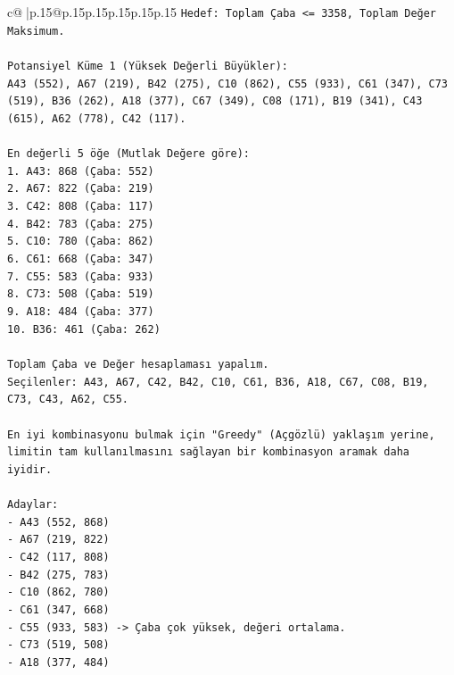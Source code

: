 \documentclass{article}
\begin{document}
{\begin{supertabular}{c@{$\;$}|p{.15\linewidth}@{}p{.15\linewidth}p{.15\linewidth}p{.15\linewidth}p{.15\linewidth}p{.15\linewidth}}
{{{\texttt{Hedef: Toplam Çaba <= 3358, Toplam Değer Maksimum.} \\
\\ 
\texttt{Potansiyel Küme 1 (Yüksek Değerli Büyükler):} \\
\texttt{A43 (552), A67 (219), B42 (275), C10 (862), C55 (933), C61 (347), C73 (519), B36 (262), A18 (377), C67 (349), C08 (171), B19 (341), C43 (615), A62 (778), C42 (117).} \\
\\ 
\texttt{En değerli 5 öğe (Mutlak Değere göre):} \\
\texttt{1. A43: 868 (Çaba: 552)} \\
\texttt{2. A67: 822 (Çaba: 219)} \\
\texttt{3. C42: 808 (Çaba: 117)} \\
\texttt{4. B42: 783 (Çaba: 275)} \\
\texttt{5. C10: 780 (Çaba: 862)} \\
\texttt{6. C61: 668 (Çaba: 347)} \\
\texttt{7. C55: 583 (Çaba: 933)} \\
\texttt{8. C73: 508 (Çaba: 519)} \\
\texttt{9. A18: 484 (Çaba: 377)} \\
\texttt{10. B36: 461 (Çaba: 262)} \\
\\ 
\texttt{Toplam Çaba ve Değer hesaplaması yapalım.} \\
\texttt{Seçilenler: A43, A67, C42, B42, C10, C61, B36, A18, C67, C08, B19, C73, C43, A62, C55.} \\
\\ 
\texttt{En iyi kombinasyonu bulmak için "Greedy" (Açgözlü) yaklaşım yerine, limitin tam kullanılmasını sağlayan bir kombinasyon aramak daha iyidir.} \\
\\ 
\texttt{Adaylar:} \\
\texttt{{-} A43 (552, 868)} \\
\texttt{{-} A67 (219, 822)} \\
\texttt{{-} C42 (117, 808)} \\
\texttt{{-} B42 (275, 783)} \\
\texttt{{-} C10 (862, 780)} \\
\texttt{{-} C61 (347, 668)} \\
\texttt{{-} C55 (933, 583) {-}> Çaba çok yüksek, değeri ortalama.} \\
\texttt{{-} C73 (519, 508)} \\
\texttt{{-} A18 (377, 484)} \\
}}}
\end{supertabular}}
\end{document}
